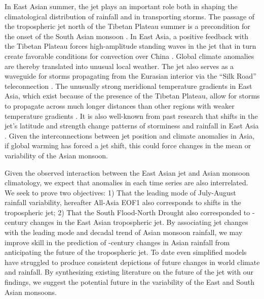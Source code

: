 	In East Asian summer, the jet plays an important role both in shaping the climatological distribution of rainfall and in transporting storms. The passage of the tropospheric jet north of the Tibetan Plateau summer is a precondition for the onset of the South Asian monsoon \citep{Yin1949,Yeh1959,Hahn1975}. In East Asia, a positive feedback with the Tibetan Plateau forces high-amplitude standing waves in the jet that in turn create favorable conditions for convection over China \citep{Yang2002,Molnar2010,Chen2015}. Global climate anomalies are thereby translated into unusual local weather\citep{Nigam1989,Broccoli1992,Park1997}. The jet also serves as a waveguide for storms propagating from the Eurasian interior via the ``Silk Road'' teleconnection \citep{Hoskins1993,Ambrizzi1997,Kosaka2012}. The unusually strong meridional temperature gradients in East Asia, which exist because of the presence of the Tibetan Plateau, allow for storms to propagate across much longer distances than other regions with weaker temperature gradients \citep{Branstator2002}. It is also well-known from past research that shifts in the jet's latitude and strength change patterns of storminess and rainfall in East Asia \citep{Liang1998,Branstator2002,Kwon2007,Du2009,Li2014}.  Given the interconnections between jet position and climate anomalies in Asia, if global warming has forced a jet shift, this could force changes in the mean or variability of the Asian monsoon.
	
	 
	Given the observed interaction between the East Asian jet and Asian monsoon climatology, we expect that anomalies in each time series are also interrelated. We seek to prove two objectives: 1) That the leading mode of July-August rainfall variability, hereafter All-Asia EOF1 \citep{Day2015} also corresponds to shifts in the tropospheric jet; 2) That the South Flood-North Drought also corresponded to -century changes in the East Asian tropospheric jet. By associating jet changes with the leading mode and decadal trend of Asian monsoon rainfall, we may improve skill in the prediction of -century changes in Asian rainfall from anticipating the future of the tropospheric jet. To date even simplified models have struggled to produce consistent depictions of future changes in world climate and rainfall. By synthesizing existing literature on the future of the jet with our findings, we suggest the potential future in the variability of the East and South Asian monsoons.
	  
